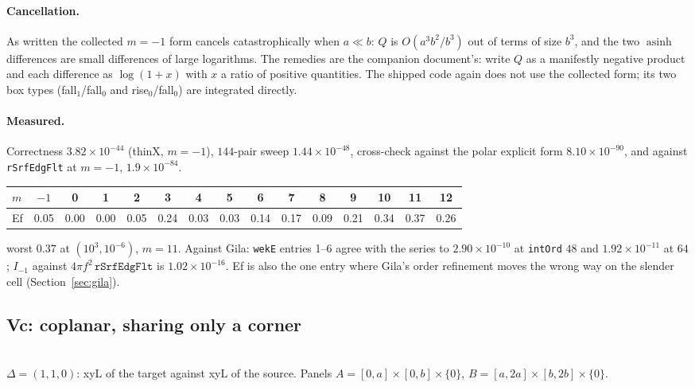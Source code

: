 \documentclass[11pt]{article}
\theoremstyle{remark}
\newcommand{\asinh}{\operatorname{asinh}}
\newcommand{\code}[1]{\texttt{#1}}
\newcommand{\geofig}[2]{\begin{center}#1\\[2pt]{\footnotesize #2}\end{center}}
\begin{document}
\paragraph{Cancellation.} As written the collected $m = -1$ form cancels catastrophically
when $a \ll b$: $Q$ is $O(a^3b^2/b^3)$ out of terms of size $b^3$, and the two $\asinh$
differences are small differences of large logarithms. The remedies are the companion
document's: write $Q$ as a manifestly negative product and each difference as
$\log(1+x)$ with $x$ a ratio of positive quantities. The shipped code again does not use
the collected form; its two box types (fall$_1$/fall$_0$ and rise$_0$/fall$_0$) are
integrated directly.

\paragraph{Measured.} Correctness $3.82\times10^{-44}$ (thinX, $m=-1$), $144$-pair sweep
$1.44\times10^{-48}$, cross-check against the polar explicit form $8.10\times10^{-90}$,
and against \code{rSrfEdgFlt} at $m = -1$, $1.9\times10^{-84}$.

\begin{center}\small
\begin{tabular}{@{}lcccccccccccccc@{}}
\toprule
$m$ & $-1$ & 0 & 1 & 2 & 3 & 4 & 5 & 6 & 7 & 8 & 9 & 10 & 11 & 12\\
\midrule
Ef & 0.05 & 0.00 & 0.00 & 0.05 & 0.24 & 0.03 & 0.03 & 0.14 & 0.17 & 0.09 & 0.21 & 0.34 & 0.37 & 0.26\\
\bottomrule
\end{tabular}
\end{center}
\noindent
worst $0.37$ at $(10^{3}, 10^{-6})$, $m = 11$. Against Gila: \code{wekE} entries 1--6
agree with the series to $2.90\times10^{-10}$ at \code{intOrd} $48$ and
$1.92\times10^{-11}$ at $64$; $I_{-1}$ against $4\pi f^2\,\code{rSrfEdgFlt}$ is
$1.02\times10^{-16}$. Ef is also the one entry where Gila's order refinement moves the
wrong way on the slender cell (Section~\ref{sec:gila}).

\subsection{Vc: coplanar, sharing only a corner}
\label{sec:Vc}

\geofig{\figVc}{$\Delta = (1,1,0)$: xyL of the target against xyL of the source. Panels
$A = [0,a]\times[0,b]\times\{0\}$, $B = [a,2a]\times[b,2b]\times\{0\}$.}
\end{document}
